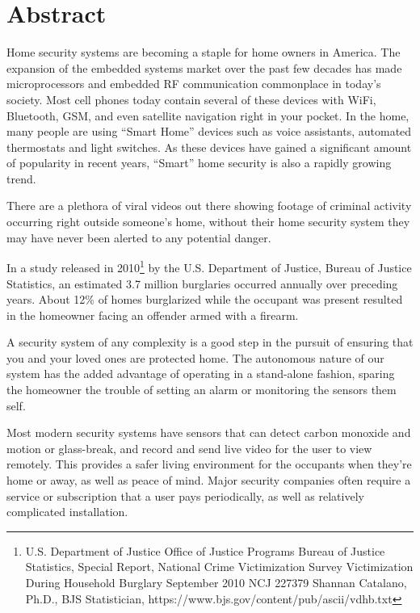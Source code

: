 \documentclass[a4paper,11pt]{report}
\begin{document}
		\section{Abstract}
	\par Home security systems are becoming a staple for home owners in America. The expansion of the embedded systems market over the past few decades has made microprocessors and embedded RF communication commonplace in today's society. Most cell phones today contain several of these devices with WiFi, Bluetooth, GSM, and even satellite navigation right in your pocket. In the home, many people are using “Smart Home” devices such as voice assistants, automated thermostats and light switches. As these devices have gained a significant amount of popularity in recent years, “Smart” home security is also a rapidly growing trend. 
	\par There are a plethora of viral videos out there showing footage of criminal activity occurring right outside someone's home, without their home security system they may have never been alerted to any potential danger. 
	\par In a study released in 2010\footnote{
		U.S. Department of Justice
		Office of Justice Programs
		Bureau of Justice Statistics, Special Report, National Crime Victimization Survey
		Victimization During Household Burglary
		September 2010   NCJ 227379
		Shannan Catalano, Ph.D., 
		BJS Statistician,
		https://www.bjs.gov/content/pub/ascii/vdhb.txt
	} by the U.S. Department of Justice, Bureau of Justice Statistics, an estimated 3.7 million burglaries occurred annually over preceding years. About 12\% of homes burglarized while the occupant was present resulted in the homeowner facing an offender armed with a firearm. 
	\par A security system of any complexity is a good step in the pursuit of ensuring that you and your loved ones are protected home. The autonomous nature of our system has the added advantage of operating in a stand-alone fashion, sparing the homeowner the trouble of setting an alarm or monitoring the sensors them self. 
	\par Most modern security systems have sensors that can detect carbon monoxide and motion or glass-break, and record and send live video for the user to view remotely. This provides a safer living environment for the occupants when they’re home or away, as well as peace of mind. Major security companies often require a service or subscription that a user pays periodically, as well as relatively complicated installation.  
\end{document}
